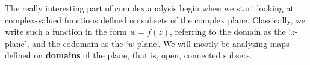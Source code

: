 The really interesting part of complex analysis begin when we start looking at complex-valued functions defined on subsets of the complex plane. Classically, we write such a function in the form $w = f(z)$, referring to the domain as the `$z$-plane', and the codomain as the `$w$-plane'. We will mostly be analyzing maps defined on {\bf domains} of the plane, that is, open, connected subsets.





